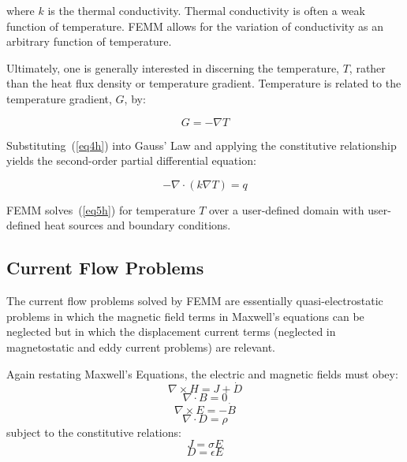 \documentclass[12pt]{report}
\begin{document}
\noindent
where $k$ is the thermal conductivity. Thermal conductivity is
often a weak function of temperature. FEMM allows for the variation
of conductivity as an arbitrary function of temperature.

Ultimately, one is generally interested in discerning the
temperature, $T$, rather than the heat flux density or temperature
gradient. Temperature is related to the temperature gradient, $G$,
by:

\begin{equation}
\label{eq4h}
G = - \nabla T
\end{equation}

Substituting~(\ref{eq4h}) into Gauss' Law and applying the
constitutive relationship yields the second-order partial
differential equation:

\begin{equation}
\label{eq5h}
 - \nabla \cdot \left( k \nabla T \right) = q
\end{equation}

\noindent
FEMM solves~(\ref{eq5h}) for temperature $T$ over a user-defined
domain with user-defined heat sources and boundary conditions.



\subsection{Current Flow Problems}

The current flow problems solved by FEMM are essentially quasi-electrostatic 
problems in which the magnetic field terms in Maxwell's equations can be neglected
but in which the displacement current terms (neglected in magnetostatic and eddy
current problems) are relevant.

Again restating Maxwell's Equations, the electric and magnetic fields must obey:
\begin{equation}
\label{quasielectrostatic1}
\nabla \times H = J + \dot{D}
\end{equation}
\begin{equation}
\label{quasielectrostatic3}
\nabla \cdot B = 0 
\end{equation}
\begin{equation}
\label{quasielectrostatic4}
\nabla \times E = -\dot{B}
\end{equation}
\begin{equation}
\nabla \cdot D = \rho
\end{equation}
subject to the constitutive relations:
\begin{equation}
J = \sigma E
\end{equation}
\begin{equation}
D = \epsilon E
\end{equation}
\end{document}
